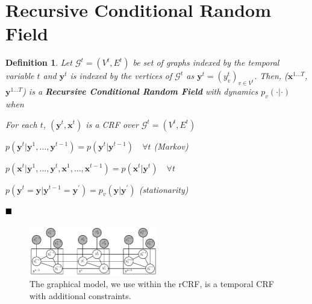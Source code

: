 \documentclass[conference]{IEEEtran}
\newtheorem{mydef}{Definition}
\begin{document}
\section{Recursive Conditional Random Field}
\begin{mydef}
Let $\mathcal{G}^t=(V^t,E^t)$ be set of graphs indexed by the temporal variable $t$ and $\mathbf{y}^t$ is indexed by the vertices of $\mathcal{G}^t$ as $\mathbf{y}^t=(y^t_v)_{v \in V^t}$. Then, ($\mathbf{x}^{1\ldots T}$,$\mathbf{y}^{1\ldots T}$) is a \textbf{\textit{Recursive Conditional Random Field}} with dynamics $p_v(\cdot|\cdot)$ when

\begin{packed_enum}
  \item For each $t$, $(\mathbf{y}^t,\mathbf{x}^t)$ is a CRF over $\mathcal{G}^t=(V^t,E^t)$
\item $p(\mathbf{y}^{t}|\mathbf{y}^{1},\ldots,\mathbf{y}^{t-1}) = p(\mathbf{y}^{t}|\mathbf{y}^{t-1}) \quad  \forall t$ \hfill (Markov)
\item $p(\mathbf{x}^t|\mathbf{y}^1,\ldots,\mathbf{y}^t,\mathbf{x}^1,\ldots,\mathbf{x}^{t-1})=p(\mathbf{x}^t|\mathbf{y}^t)\quad  \forall t$ \hfill
\item $p(\mathbf{y}^t=\mathbf{y}|\mathbf{y}^{t-1}=\mathbf{y^\prime})=p_v(\mathbf{y}|\mathbf{y^\prime})$ \hfill (stationarity)
\end{packed_enum}
$\hfill \blacksquare$
\end{mydef}
\begin{figure}[ht]
\includegraphics[width=0.5\textwidth]{hmmcrf}
\caption{The graphical model, we use within the rCRF, is a temporal CRF with additional constraints.}%
\label{rCrf}
\end{figure}
\end{document}
